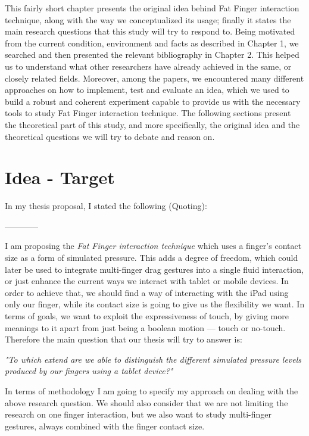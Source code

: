 
This fairly short chapter presents the original idea behind Fat Finger interaction technique, along with the way we conceptualized its usage; finally it states the main research questions that this study will try to respond to. Being motivated from the current condition, environment and facts as described in Chapter 1, we searched and then presented the relevant bibliography in Chapter 2. This helped us to understand what other researchers have already achieved in the same, or closely related fields. Moreover, among the papers, we encountered many different approaches on how to implement, test and evaluate an idea, which we used to build a robust and coherent experiment capable to provide us with the necessary tools to study Fat Finger interaction technique. The following sections present the theoretical part of this study, and more specifically, the original idea and the theoretical questions we will try to debate and reason on.

\section{Idea - Target}
In my thesis proposal, I stated the following (Quoting):

------------

I am proposing the \emph{Fat Finger interaction technique} which uses a finger's contact size as a form of simulated pressure. This adds a degree of freedom, which could later be used to integrate multi-finger drag gestures into a single fluid interaction, or just enhance the current ways we interact with tablet or mobile devices. In order to achieve that, we should find a way of interacting with the iPad using only our finger, while its contact size is going to give us the flexibility we want. In terms of goals, we want to exploit the expressiveness of touch, by giving more meanings to it apart from just being a boolean motion --- touch or no-touch. Therefore the main question that our thesis will try to answer is:

\emph{"To which extend are we able to distinguish the different simulated pressure levels produced by our fingers using a tablet device?"}

In terms of methodology I am going to specify my approach on dealing with the above research question. We should also consider that we are not limiting the research on one finger interaction, but we also want to study multi-finger gestures, always combined with the finger contact size.


